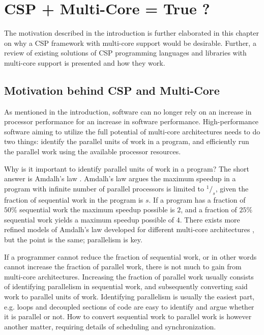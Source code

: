 

\chapter{CSP + Multi\hyp{}Core = True ?}
\label{ch:multicore_csp}

The motivation described in the introduction is further elaborated in this chapter on why a CSP framework with multi\hyp{}core support would be desirable. Further, a review of existing solutions of CSP programming languages and libraries with multi\hyp{}core support is presented and how they work.


\section{Motivation behind CSP and Multi\hyp{}Core}
\label{sec:multicore_csp_motivation}


As mentioned in the introduction, software can no longer rely on an increase in processor performance for an increase in software performance. High\hyp{}performance software aiming to utilize the full potential of multi\hyp{}core architectures needs to do two things: identify the parallel units of work in a program, and efficiently run the parallel work using the available processor resources. 

Why is it important to identify parallel units of work in a program? The short answer is Amdalh's law \citep{amdahl1967validity}. Amdalh's law argues the maximum speedup in a program with infinite number of parallel processors is limited to $^1/_s$, given the fraction of sequential work in the program is $s$. If a program has a fraction of $50\%$ sequential work the maximum speedup possible is $2$, and a fraction of $25\%$ sequential work yields a maximum speedup possible of $4$. There exists more refined models of Amdalh's law developed for different multi\hyp{}core architectures \citep{sun2010reevaluating}, but the point is the same; parallelism is key.

If a programmer cannot reduce the fraction of sequential work, or in other words cannot increase the fraction of parallel work, there is not much to gain from multi\hyp{}core architectures. Increasing the fraction of parallel work usually consists of identifying parallelism in sequential work, and subsequently converting said work to parallel units of work. Identifying parallelism is usually the easiest part, e.g. loops and decoupled sections of code are easy to identify and argue whether it is parallel or not. How to convert sequential work to parallel work is however another matter, requiring details of scheduling and synchronization.

